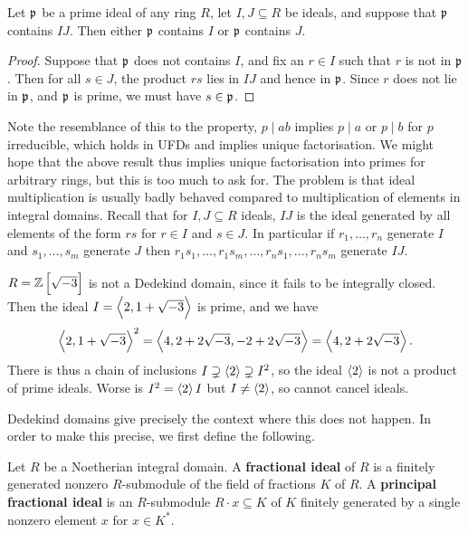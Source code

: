 \begin{lemma}
\label{lem:11.1.3}
Let $ \mathfrak{p} $ be a prime ideal of any ring $ R $, let $ I, J \subseteq R $ be ideals, and suppose that $ \mathfrak{p} $ contains $ IJ $. Then either $ \mathfrak{p} $ contains $ I $ or $ \mathfrak{p} $ contains $ J $.
\end{lemma}

\begin{proof}
Suppose that $ \mathfrak{p} $ does not contains $ I $, and fix an $ r \in I $ such that $ r $ is not in $ \mathfrak{p} $. Then for all $ s \in J $, the product $ rs $ lies in $ IJ $ and hence in $ \mathfrak{p} $. Since $ r $ does not lie in $ \mathfrak{p} $, and $ \mathfrak{p} $ is prime, we must have $ s \in \mathfrak{p} $.
\end{proof}

Note the resemblance of this to the property, $ p \mid ab $ implies $ p \mid a $ or $ p \mid b $ for $ p $ irreducible, which holds in UFDs and implies unique factorisation. We might hope that the above result thus implies unique factorisation into primes for arbitrary rings, but this is too much to ask for. The problem is that ideal multiplication is usually badly behaved compared to multiplication of elements in integral domains. Recall that for $ I, J \subseteq R $ ideals, $ IJ $ is the ideal generated by all elements of the form $ rs $ for $ r \in I $ and $ s \in J $. In particular if $ r_1, \dots, r_n $ generate $ I $ and $ s_1, \dots, s_m $ generate $ J $ then $ r_1s_1, \dots, r_1s_m, \dots, r_ns_1, \dots, r_ns_m $ generate $ IJ $.

\pagebreak

\begin{example*}
$ R = \ZZ\sbr{\sqrt{-3}} $ is not a Dedekind domain, since it fails to be integrally closed. Then the ideal $ I = \left\langle 2, 1 + \sqrt{-3} \right\rangle $ is prime, and we have
$$ \left\langle 2, 1 + \sqrt{-3} \right\rangle^2 = \left\langle 4, 2 + 2\sqrt{-3}, -2 + 2\sqrt{-3} \right\rangle = \left\langle 4, 2 + 2\sqrt{-3} \right\rangle. $$
There is thus a chain of inclusions $ I \supsetneq \left\langle 2 \right\rangle \supsetneq I^2 $, so the ideal $ \left\langle 2 \right\rangle $ is not a product of prime ideals. Worse is $ I^2 = \left\langle 2 \right\rangle I $ but $ I \ne \left\langle 2 \right\rangle $, so cannot cancel ideals.
\end{example*}

Dedekind domains give precisely the context where this does not happen. In order to make this precise, we first define the following.

\begin{definition}
Let $ R $ be a Noetherian integral domain. A \textbf{fractional ideal} of $ R $ is a finitely generated nonzero $ R $-submodule of the field of fractions $ K $ of $ R $. A \textbf{principal fractional ideal} is an $ R $-submodule $ R \cdot x \subseteq K $ of $ K $ finitely generated by a single nonzero element $ x $ for $ x \in K^* $.
\end{definition}

